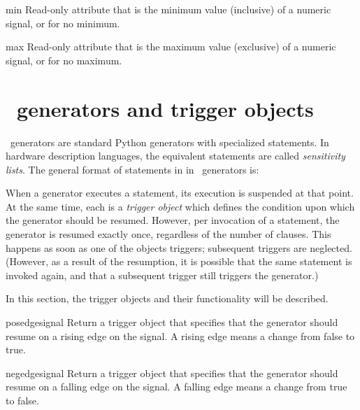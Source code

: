 \begin{memberdesc}[Signal]{min}
Read-only attribute that is the minimum value (inclusive) of a
numeric signal, or  for no minimum.
\end{memberdesc}
\begin{memberdesc}[Signal]{max}
Read-only attribute that is the maximum value
(exclusive) of a numeric signal, or  for no 
maximum.
\end{memberdesc}

\section{\myhdl\ generators and trigger objects \label{ref-gen}}

\myhdl\ generators are standard Python generators with specialized
 statements. In hardware description languages, the equivalent
statements are called 
\emph{sensitivity lists}. The general format
of  statements in in \myhdl\ generators is:

\hspace{\leftmargin} 

When a generator executes a  statement, its
execution is suspended at that point. At the same time, each
 is a \emph{trigger object} which defines the condition
upon which the generator should be resumed. However, per invocation of a
 statement, the generator is resumed exactly once,
regardless of the number of clauses. This happens as soon as one
of the objects triggers; subsequent triggers are
neglected. (However, as a result of the resumption, it is possible
that the same  statement is invoked again, and that a
subsequent trigger still triggers the generator.)

In this section, the trigger objects and their functionality will be
described. 

\begin{funcdesc}{posedge}{signal}
Return a trigger object that specifies that the generator should
resume on a rising edge on the signal. A rising edge means a change
from false to true.
\end{funcdesc}

\begin{funcdesc}{negedge}{signal}
Return a trigger object that specifies that the generator should
resume on a falling edge on the signal. A falling edge means a change
from true to false.
\end{funcdesc}

